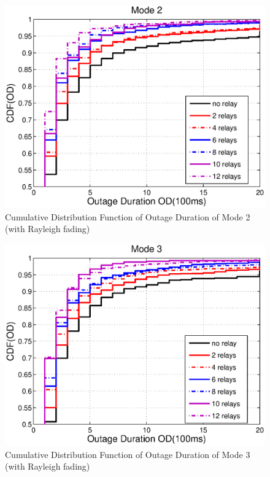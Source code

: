 \begin{figure}
\centering
\includegraphics[width=12cm]{OutageDuration_Rayleigh_Mode2_V2.eps}
\caption{Cumulative Distribution Function of Outage Duration of Mode 2 (with Rayleigh fading)}
\label{Mode2Out}
\end{figure}
\begin{figure}
\centering
\includegraphics[width=12cm]{OutageDuration_Rayleigh_Mode3_V2.eps}
\caption{Cumulative Distribution Function of Outage Duration of Mode 3 (with Rayleigh fading)}
\label{Mode3Out}
\end{figure}

